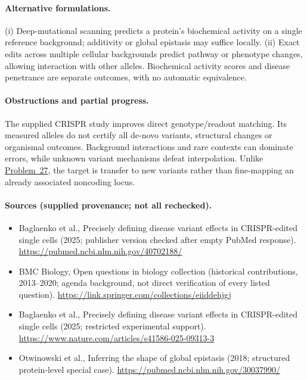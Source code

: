 \documentclass[11pt]{article}
\begin{document}
\paragraph{Alternative formulations.} (i) Deep-mutational scanning predicts a protein's biochemical activity on a single reference background; additivity or global epistasis may suffice locally. (ii) Exact edits across multiple cellular backgrounds predict pathway or phenotype changes, allowing interaction with other alleles. Biochemical activity scores and disease penetrance are separate outcomes, with no automatic equivalence.
\paragraph{Obstructions and partial progress.} The supplied CRISPR study improves direct genotype/readout matching. Its measured alleles do not certify all de-novo variants, structural changes or organismal outcomes. Background interactions and rare contexts can dominate errors, while unknown variant mechanisms defeat interpolation. Unlike \href{https://we-solve.github.io/problems/causal-non-coding-variants-faab0ea9/}{Problem~27}, the target is transfer to new variants rather than fine-mapping an already associated noncoding locus.
\paragraph{Sources (supplied provenance; not all rechecked).}
\begin{itemize}
\item Baglaenko et al., Precisely defining disease variant effects in CRISPR-edited single cells (2025; publisher version checked after empty PubMed response). \url{https://pubmed.ncbi.nlm.nih.gov/40702188/}
\item BMC Biology, Open questions in biology collection (historical contributions, 2013--2020; agenda background, not direct verification of every listed question). \url{https://link.springer.com/collections/eiiddehjgj}
\item Baglaenko et al., Precisely defining disease variant effects in CRISPR-edited single cells (2025; restricted experimental support). \url{https://www.nature.com/articles/s41586-025-09313-3}
\item Otwinowski et al., Inferring the shape of global epistasis (2018; structured protein-level special case). \url{https://pubmed.ncbi.nlm.nih.gov/30037990/}
\end{itemize}
\end{document}

